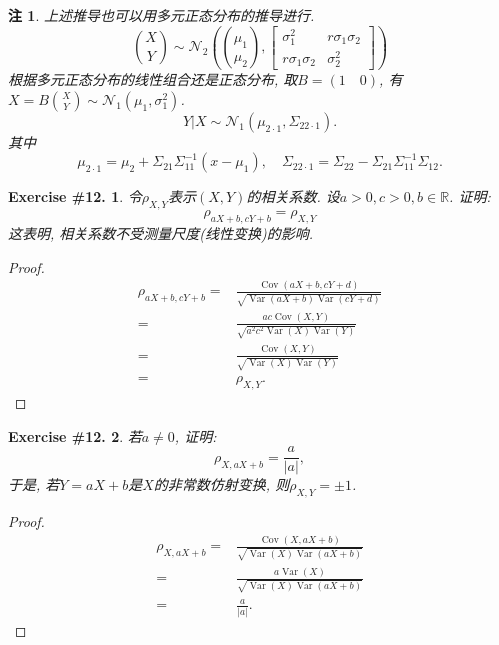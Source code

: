 \documentclass[UTF8, a4paper]{article}
\newtheorem{exercise}{Exercise \#12.}
\newtheorem*{remark}{注}
\begin{document}
\begin{remark}
上述推导也可以用多元正态分布的推导进行.
$$
\binom{X}{Y} \sim \mathcal{N}_2 \left(\binom{\mu_1}{\mu_2}, \left[\begin{matrix}
    \sigma_1^2 & r\sigma_1\sigma_2 \\
    r\sigma_1\sigma_2 & \sigma_2^2
    \end{matrix}\right]\right)
$$
根据多元正态分布的线性组合还是正态分布, 取\(B = (1 \quad 0)\), 有\(X = B\binom{X}{Y} \sim \mathcal{N}_1 (\mu_1, \sigma_1^2)\).
$$
Y|X \sim \mathcal{N}_1\left(\mu_{2\cdot 1}, \Sigma_{22\cdot 1}\right).
$$
其中
$$
\mu_{2\cdot 1} = \mu_2 + \Sigma_{21} \Sigma_{11}^{-1}(x - \mu_1), \quad \Sigma_{22\cdot 1} = \Sigma_{22} - \Sigma_{21}\Sigma_{11}^{-1}\Sigma_{12}.
$$
\end{remark}



\begin{framed}
\begin{exercise}
令\(\rho_{X,Y}\)表示\((X,Y)\)的相关系数. 设\(a>0,c>0, b\in\mathbb{R}\). 证明:
$$
\rho_{a X+b, c Y+b}=\rho_{X, Y}
$$
这表明, 相关系数不受测量尺度(线性变换)的影响.
\end{exercise}
\end{framed}

\begin{proof}
$$
\begin{aligned}
    \rho_{a X+b, c Y+b} =& \frac{\operatorname{Cov}(aX + b, cY + d)}{\sqrt{\operatorname{Var}(aX + b)\operatorname{Var}(cY + d)}} \\
    =& \frac{ac\operatorname{Cov}(X, Y)}{\sqrt{a^2c^2\operatorname{Var}(X)\operatorname{Var}(Y)}} \\
    =& \frac{\operatorname{Cov}(X, Y)}{\sqrt{\operatorname{Var}(X)\operatorname{Var}(Y)}} \\
    =& \rho_{X, Y}.
\end{aligned}
$$
\end{proof}


\begin{framed}
\begin{exercise}
若\(a\neq 0\), 证明:
$$
\rho_{X, a X+b}=\frac{a}{|a|},
$$
于是, 若\(Y = aX+b\)是\(X\)的非常数仿射变换, 则\(\rho_{X,Y} = \pm 1\).
\end{exercise}
\end{framed}

\begin{proof}
$$
\begin{aligned}
    \rho_{X, aX+b} =& \frac{\operatorname{Cov}(X, aX+b)}{\sqrt{\operatorname{Var}(X)\operatorname{Var}(aX+b)}} \\
    =& \frac{a\operatorname{Var}(X)}{\sqrt{\operatorname{Var}(X)\operatorname{Var}(aX+b)}} \\
    =& \frac{a}{|a|}.
\end{aligned}
$$
\end{proof}
\end{document}
